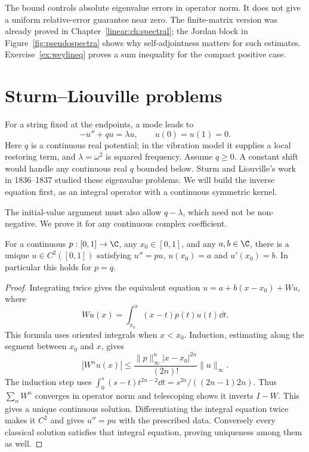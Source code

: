 The bound controls absolute eigenvalue errors in operator norm. It does not give a uniform relative-error guarantee near zero. The finite-matrix version was already proved in Chapter~\ref{linear:ch:spectral}; the Jordan block in Figure~\ref{fig:pseudospectra} shows why self-adjointness matters for such estimates. Exercise~\ref{ex:weylineq} proves a sum inequality for the compact positive case.

\section{Sturm--Liouville problems}

For a string fixed at the endpoints, a mode leads to
\begin{equation}\label{eq:sl}
-u''+qu=\lambda u,\qquad u(0)=u(1)=0.
\end{equation}
Here $q$ is a continuous real potential; in the vibration model it supplies a local restoring term, and $\lambda=\omega^2$ is squared frequency. Assume $q\ge0$. A constant shift would handle any continuous real $q$ bounded below. Sturm and Liouville's work in 1836--1837 studied these eigenvalue problems. We will build the inverse equation first, as an integral operator with a continuous symmetric kernel.

The initial-value argument must also allow $q-\lambda$, which need not be non-negative. We prove it for any continuous complex coefficient.

\begin{lemma}\label{lem:ivp}
For a continuous $p:[0,1]\to\C$, any $x_0\in[0,1]$, and any $a,b\in\C$, there is a unique $u\in C^2([0,1])$ satisfying $u''=pu$, $u(x_0)=a$ and $u'(x_0)=b$. In particular this holds for $p=q$.
\end{lemma}
\begin{proof}
Integrating twice gives the equivalent equation $u=a+b(x-x_0)+Wu$, where
\[
Wu(x)=\int_{x_0}^x(x-t)p(t)u(t)\dd t.
\]
This formula uses oriented integrals when $x<x_0$. Induction, estimating along the segment between $x_0$ and $x$, gives
\[
|W^nu(x)|\le\frac{\|p\|_\infty^n|x-x_0|^{2n}}{(2n)!}\|u\|_\infty.
\]
The induction step uses $\int_0^s(s-t)t^{2n-2}\dd t=s^{2n}/((2n-1)2n)$. Thus $\sum_nW^n$ converges in operator norm and telescoping shows it inverts $I-W$. This gives a unique continuous solution. Differentiating the integral equation twice makes it $C^2$ and gives $u''=pu$ with the prescribed data. Conversely every classical solution satisfies that integral equation, proving uniqueness among them as well.
\end{proof}

